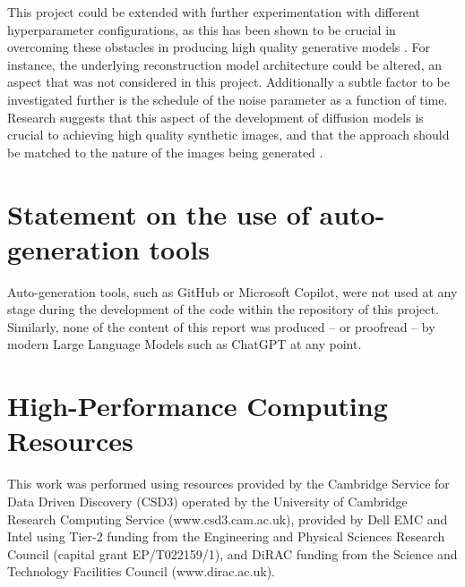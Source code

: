 \documentclass[12pt]{article}
\begin{document}
This project could be extended with further experimentation with different hyperparameter configurations, as this has been shown to be crucial in overcoming these obstacles in producing high quality generative models \cite{fi15080260}.
For instance, the underlying reconstruction model architecture could be altered, an aspect that was not considered in this project.
Additionally a subtle factor to be investigated further is the schedule of the noise parameter as a function of time.
Research suggests that this aspect of the development of diffusion models is crucial to achieving high quality synthetic images,
and that the approach should be matched to the nature of the images being generated \cite{chen2023importance}.




\appendix

\section{Statement on the use of auto-generation tools}

Auto-generation tools, such as GitHub or Microsoft Copilot, were not used at any stage during the development of the code within the repository of this project.
Similarly, none of the content of this report was produced -- or proofread -- by modern Large Language Models such as ChatGPT at any point.

\section {High-Performance Computing Resources}

This work was performed using resources provided by the Cambridge Service for Data Driven Discovery (CSD3) operated by the University of Cambridge Research Computing Service (www.csd3.cam.ac.uk),
provided by Dell EMC and Intel using Tier-2 funding from the Engineering and Physical Sciences Research Council (capital grant EP/T022159/1),
and DiRAC funding from the Science and Technology Facilities Council (www.dirac.ac.uk).
\end{document}
